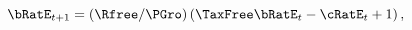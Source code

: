 \begin{equation}
\bRatE_{t+1} = (\Rfree /\PGro) \left(\TaxFree \bRatE_{t} -\cRatE_{t}+1\right),
\label{eq:ibcnormStakes}
\end{equation}
